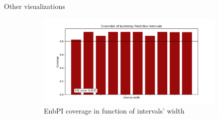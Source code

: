 \documentclass{beamer}
\begin{document}
\begin{frame}{Other visualizations}
\begin{figure}[ht]
\begin{subfigure}[b]{0.32\textwidth}
            \includegraphics[width=1.05\textwidth, height=1.1\textwidth]{Figures/timeseries/without-change-point/coverage-vs-width-timeseries-problem.png}
            \caption{EnbPI coverage in function of intervals' width}
        \end{subfigure}
        \hfill %
        \begin{subfigure}[b]{0.32\textwidth} %
            \centering

\end{subfigure}
\end{figure}
\end{frame}
\end{document}
